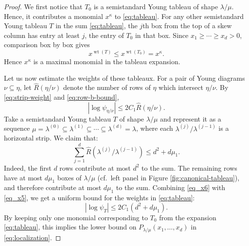 \documentclass[11pt,reqno]{amsart}
\theoremstyle{definition}
\theoremstyle{remark}
\numberwithin{equation}{section}
\newcommand{\wt}{\operatorname{wt}}
\begin{document}
\begin{proof}
We first notice that $T_0$ is a semistandard Young tableau of shape $\lambda/\mu$. Hence, it contributes a monomial
$x^{\kappa}$ to \eqref{eq:tableau}. For any other semistandard Young tableau $T$ in the sum \eqref{eq:tableau}, the $j$th box from the top of a
skew column has entry at least $j$, the entry of $T_0$ in that box. Since
$x_1\ge\cdots\ge x_d>0$, comparison box by box gives
\begin{equation}
\label{eq_x7}
 x^{\wt(T)}\le x^{\wt(T_0)}=x^\kappa.
\end{equation}
Hence $x^\kappa$ is a maximal monomial in the tableau expansion.

\smallskip

Let us now estimate the weights of these tableaux. For a pair of Young diagrams $\nu\subseteq\eta$, let $\hat R(\eta/\nu)$ denote the number of rows of $\eta$ which intersect $\eta/\nu$. By \eqref{eq:strip-weight} and \eqref{eq:row-b-bound},
\begin{equation}\label{eq_x5}
 |\log\psi_{\eta/\nu}|\le2C_1 \hat R(\eta/\nu).
\end{equation}
Take a semistandard Young tableau $T$ of shape $\lambda/\mu$ and represent it as a sequence $
 \mu=\lambda^{(0)}\subseteq\lambda^{(1)}\subseteq\cdots
 \subseteq\lambda^{(d)}=\lambda$, where each $\lambda^{(j)}/\lambda^{(j-1)}$ is a horizontal strip. We claim that:
\begin{equation}
\label{eq_x6}
  \sum_{j=1}^d \hat R(\lambda^{(j)}/\lambda^{(j-1)})
 \le d^2+d\mu_1.
\end{equation}
Indeed, the first $d$ rows contribute at most $d^2$ to the sum. The remaining rows have at most $d \mu_1$ boxes of $\lambda/\mu$ (cf.\ left panel in Figure \ref{fig:canonical-tableau}), and therefore contribute at most $d\mu_1$ to the sum. Combining \eqref{eq_x6} with \eqref{eq_x5}, we get a uniform bound for the weights in \eqref{eq:tableau}:
\begin{equation}\label{eq:tableau-weight-bound}
 |\log\psi_T|\le2C_1(d^2+d\mu_1).
\end{equation}
By keeping only one monomial corresponding to $T_0$ from the expansion \eqref{eq:tableau}, this implies the lower bound on $P_{\lambda/\mu}(x_1,\ldots,x_d)$ in \eqref{eq:localization}. 


\end{proof}
\end{document}
